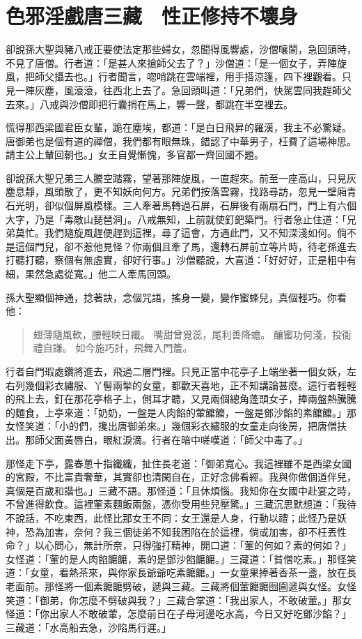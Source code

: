 
\chapter{色邪淫戲唐三藏　性正修持不壞身}

卻說孫大聖與豬八戒正要使法定那些婦女，忽聞得風響處，沙僧嚷鬧，急回頭時，不見了唐僧。行者道：「是甚人來搶師父去了？」沙僧道：「是一個女子，弄陣旋風，把師父攝去也。」行者聞言，唿哨跳在雲端裡，用手搭涼篷，四下裡觀看。只見一陣灰塵，風滾滾，往西北上去了。急回頭叫道：「兄弟們，快駕雲同我趕師父去來。」八戒與沙僧即把行囊捎在馬上，響一聲，都跳在半空裡去。

慌得那西梁國君臣女輩，跪在塵埃，都道：「是白日飛昇的羅漢，我主不必驚疑。唐御弟也是個有道的禪僧，我們都有眼無珠，錯認了中華男子，枉費了這場神思。請主公上輦回朝也。」女王自覺慚愧，多官都一齊回國不題。

卻說孫大聖兄弟三人騰空踏霧，望著那陣旋風，一直趕來。前至一座高山，只見灰塵息靜，風頭散了，更不知妖向何方。兄弟們按落雲霧，找路尋訪，忽見一壁廂青石光明，卻似個屏風模樣。三人牽著馬轉過石屏，石屏後有兩扇石門，門上有六個大字，乃是「毒敵山琵琶洞」。八戒無知，上前就使釘鈀築門。行者急止住道：「兄弟莫忙。我們隨旋風趕便趕到這裡，尋了這會，方遇此門，又不知深淺如何。倘不是這個門兒，卻不惹他見怪？你兩個且牽了馬，還轉石屏前立等片時，待老孫進去打聽打聽，察個有無虛實，卻好行事。」沙僧聽說，大喜道：「好好好，正是粗中有細，果然急處從寬。」他二人牽馬回頭。

孫大聖顯個神通，捻著訣，念個咒語，搖身一變，變作蜜蜂兒，真個輕巧。你看他：
\begin{quote}
翅薄隨風軟，腰輕映日纖。
嘴甜曾覓蕊，尾利善降蟾。
釀蜜功何淺，投衙禮自謙。
如今施巧計，飛舞入門簷。
\end{quote}

行者自門瑕處鑽將進去，飛過二層門裡。只見正當中花亭子上端坐著一個女妖，左右列幾個彩衣繡服、丫髻兩揫的女童，都歡天喜地，正不知講論甚麼。這行者輕輕的飛上去，釘在那花亭格子上，側耳才聽，又見兩個總角蓬頭女子，捧兩盤熱騰騰的麵食，上亭來道：「奶奶，一盤是人肉餡的葷饝饝，一盤是鄧沙餡的素饝饝。」那女怪笑道：「小的們，攙出唐御弟來。」幾個彩衣繡服的女童走向後房，把唐僧扶出。那師父面黃唇白，眼紅淚滴。行者在暗中嗟嘆道：「師父中毒了。」

那怪走下亭，露春蔥十指纖纖，扯住長老道：「御弟寬心。我這裡雖不是西梁女國的宮殿，不比富貴奢華，其實卻也清閑自在，正好念佛看經。我與你做個道伴兒，真個是百歲和諧也。」三藏不語。那怪道：「且休煩惱。我知你在女國中赴宴之時，不曾進得飲食。這裡葷素麵飯兩盤，憑你受用些兒壓驚。」三藏沉思默想道：「我待不說話，不吃東西，此怪比那女王不同：女王還是人身，行動以禮；此怪乃是妖神，恐為加害，奈何？我三個徒弟不知我困陷在於這裡，倘或加害，卻不枉丟性命？」以心問心，無計所奈，只得強打精神，開口道：「葷的何如？素的何如？」女怪道：「葷的是人肉餡饝饝，素的是鄧沙餡饝饝。」三藏道：「貧僧吃素。」那怪笑道：「女童，看熱茶來，與你家長爺爺吃素饝饝。」一女童果捧著香茶一盞，放在長老面前。那怪將一個素饝饝劈破，遞與三藏。三藏將個葷饝饝囫圇遞與女怪。女怪笑道：「御弟，你怎麼不劈破與我？」三藏合掌道：「我出家人，不敢破葷。」那女怪道：「你出家人不敢破葷，怎麼前日在子母河邊吃水高，今日又好吃鄧沙餡？」三藏道：「水高船去急，沙陷馬行遲。」

